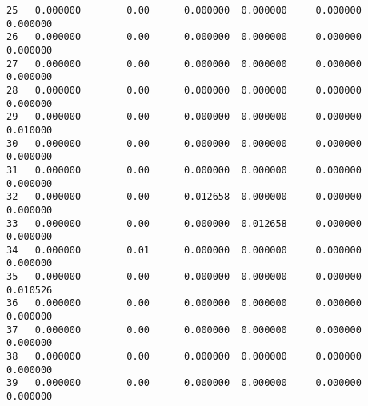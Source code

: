 \documentclass[11pt]{article}
\begin{document}
\begin{tcolorbox}[breakable, size=fbox, boxrule=.5pt, pad at break*=1mm, opacityfill=0]
\begin{Verbatim}[commandchars=\\\{\}]
25   0.000000        0.00      0.000000  0.000000     0.000000      0.000000
26   0.000000        0.00      0.000000  0.000000     0.000000      0.000000
27   0.000000        0.00      0.000000  0.000000     0.000000      0.000000
28   0.000000        0.00      0.000000  0.000000     0.000000      0.000000
29   0.000000        0.00      0.000000  0.000000     0.000000      0.010000
30   0.000000        0.00      0.000000  0.000000     0.000000      0.000000
31   0.000000        0.00      0.000000  0.000000     0.000000      0.000000
32   0.000000        0.00      0.012658  0.000000     0.000000      0.000000
33   0.000000        0.00      0.000000  0.012658     0.000000      0.000000
34   0.000000        0.01      0.000000  0.000000     0.000000      0.000000
35   0.000000        0.00      0.000000  0.000000     0.000000      0.010526
36   0.000000        0.00      0.000000  0.000000     0.000000      0.000000
37   0.000000        0.00      0.000000  0.000000     0.000000      0.000000
38   0.000000        0.00      0.000000  0.000000     0.000000      0.000000
39   0.000000        0.00      0.000000  0.000000     0.000000      0.000000


\end{Verbatim}
\end{tcolorbox}
\end{document}
